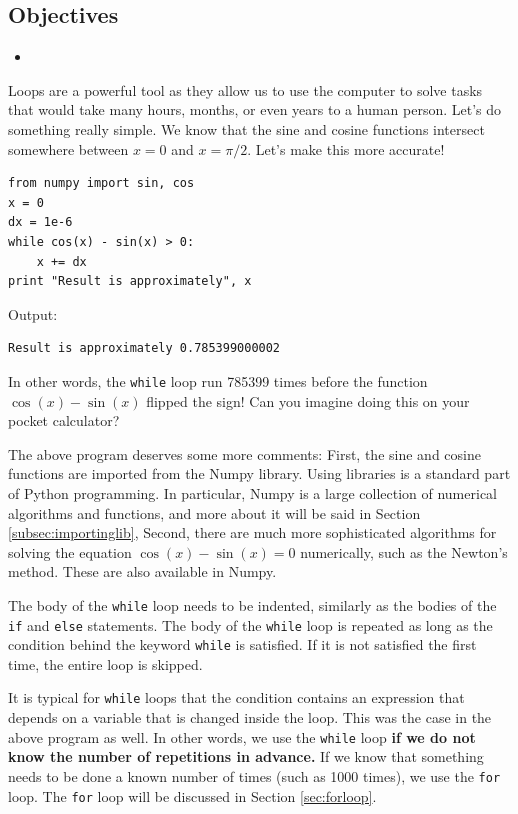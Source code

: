 \documentclass[article,A4,12pt]{llncs}
\begin{document}
\subsection{Objectives}

\begin{itemize}
\item
\end{itemize}

Loops are a powerful tool as they allow us to use the computer to solve
tasks that would take many hours, months, or even years to a human person. 
Let's do something really simple. We know that the sine and cosine functions 
intersect somewhere between $x = 0$ and $x = \pi/2$. Let's make this more accurate!

\begin{verbatim}
from numpy import sin, cos
x = 0
dx = 1e-6
while cos(x) - sin(x) > 0:
    x += dx    
print "Result is approximately", x
\end{verbatim}
Output:

\begin{verbatim}
Result is approximately 0.785399000002
\end{verbatim}
In other words, the {\tt while} loop run 785399 times before 
the function $\cos(x) - \sin(x)$ flipped the sign! Can you 
imagine doing this on your pocket calculator?

The above program deserves some more comments: First, the sine and cosine 
functions are imported from the Numpy library. Using libraries 
is a standard part of Python programming. In particular, Numpy 
is a large collection of numerical algorithms and functions, and 
more about it will be said in Section \ref{subsec:importinglib},
Second, there are much more sophisticated algorithms for solving 
the equation $\cos(x) - \sin(x) = 0$ numerically, such as the Newton's 
method. These are also available in Numpy.

The body of the {\tt while} loop needs to be indented, similarly as
the bodies of the {\tt if} and {\tt else} statements. The body of
the {\tt while} loop
is repeated as long as the condition behind the keyword {\tt while}
is satisfied. If it is not satisfied the first time, the entire 
loop is skipped. 

It is typical for {\tt while} loops that the condition contains 
an expression that depends on a variable that is changed inside the 
loop. This was the case in the above program as well. In other 
words, we use the {\tt while} loop {\bf if we do not know the number of 
repetitions in advance.} If we know that something needs to be done
a known number of times (such as 1000 times), we use the {\tt for} loop.
The {\tt for} loop will be discussed in Section \ref{sec:forloop}.\\
\end{document}
